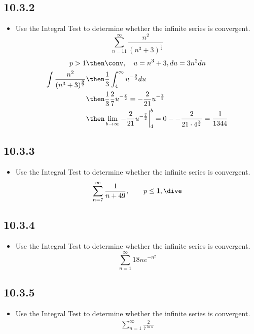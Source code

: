 \begin{itemize}
    \subsection{10.3.2}
    \begin{itemize}
      \item Use the Integral Test to determine whether the infinite series is
        convergent.
        \[%
          \sum_{n=11}^{\infty} \frac{n^2}{(n^3 + 3)^{\frac{9}{2}}}
        \]%
        \begin{align*}
          p > 1 &\then \conv, \quad u = n^3 + 3, du=3n^2dn \\
          \int \frac{n^2}{(n^3 + 3)^{\frac{9}{2}}}
                &\then \frac{1}{3} \int_4^\infty u^{-\frac{9}{2}}du \\
          &\then \frac{1}{3}\frac{2}{7}u^{-\frac{7}{2}} = -\frac{2}{21}u^{-\frac{7}{2}} \\
          &\then \lim_{b \to \infty} -\frac{2}{21}u^{-\frac{7}{2}}\bigg|_{4}^{b}
          = 0 - -\frac{2}{21 \cdot 4^{\frac{7}{2}}} = \frac{1}{1344}
        \end{align*}
    \end{itemize}

    \subsection{10.3.3}
    \begin{itemize}
      \item Use the Integral Test to determine whether the infinite series is
        convergent.
        \[%
         \sum_{n=7}^{\infty} \frac{1}{n+49}, \qquad p \leq 1, \dive
        \]%
    \end{itemize}

    \subsection{10.3.4}
    \begin{itemize}
      \item Use the Integral Test to determine whether the infinite series is
        convergent.
        \[%
          \sum_{n=1}^{\infty} 18ne^{-n^2}
        \]%
    \end{itemize}

    \subsection{10.3.5}
    \begin{itemize}
      \item Use the Integral Test to determine whether the infinite series is
        convergent.
        \begin{align*}
          \sum_{n=1}^{\infty} \frac{2}{7^{\ln n}}
        \end{align*}
    \end{itemize}


\end{itemize}
